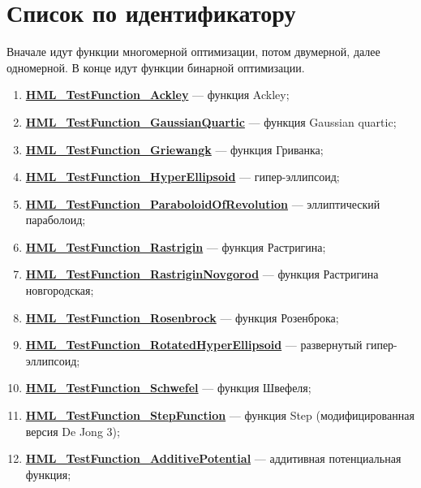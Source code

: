 \section {Список по идентификатору}

Вначале идут функции многомерной оптимизации, потом двумерной, далее одномерной. В конце идут функции бинарной оптимизации.

\begin{enumerate}
 \item \hyperref[TestFunctions:section:HML_TestFunction_Ackley]{\textbf{HML\_TestFunction\_Ackley}} --- функция Ackley;
 \item \hyperref[TestFunctions:section:HML_TestFunction_GaussianQuartic]{\textbf{HML\_TestFunction\_GaussianQuartic}} --- функция Gaussian quartic;
 \item \hyperref[TestFunctions:section:HML_TestFunction_Griewangk]{\textbf{HML\_TestFunction\_Griewangk}} --- функция Гриванка;
 \item \hyperref[TestFunctions:section:HML_TestFunction_HyperEllipsoid]{\textbf{HML\_TestFunction\_HyperEllipsoid}} --- гипер-эллипсоид;
 \item \hyperref[TestFunctions:section:HML_TestFunction_ParaboloidOfRevolution]{\textbf{HML\_TestFunction\_ParaboloidOfRevolution}} --- эллиптический параболоид;
 \item \hyperref[TestFunctions:section:HML_TestFunction_Rastrigin]{\textbf{HML\_TestFunction\_Rastrigin}} --- функция Растригина;
 \item \hyperref[TestFunctions:section:HML_TestFunction_RastriginNovgorod]{\textbf{HML\_TestFunction\_RastriginNovgorod}} --- функция Растригина новгородская;
 \item \hyperref[TestFunctions:section:HML_TestFunction_Rosenbrock]{\textbf{HML\_TestFunction\_Rosenbrock}} --- функция Розенброка;
 \item \hyperref[TestFunctions:section:HML_TestFunction_RotatedHyperEllipsoid]{\textbf{HML\_TestFunction\_RotatedHyperEllipsoid}} --- развернутый гипер-эллипсоид;
 \item \hyperref[TestFunctions:section:HML_TestFunction_Schwefel]{\textbf{HML\_TestFunction\_Schwefel}} --- функция Швефеля;
 \item \hyperref[TestFunctions:section:HML_TestFunction_StepFunction]{\textbf{HML\_TestFunction\_StepFunction}} --- функция Step (модифицированная версия De Jong 3);
 \item \hyperref[TestFunctions:section:HML_TestFunction_AdditivePotential]{\textbf{HML\_TestFunction\_AdditivePotential}} --- аддитивная потенциальная функция;

\end{enumerate}
